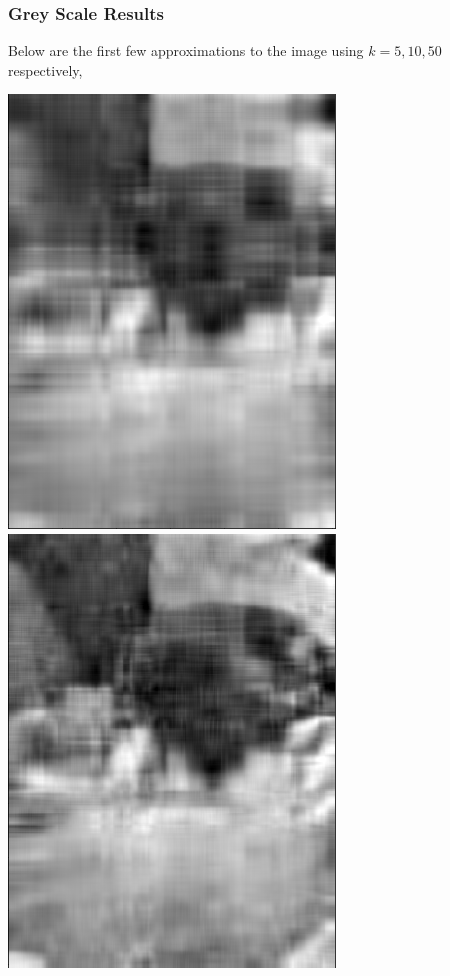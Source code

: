 \documentclass[letterpaper,12pt]{article}
\begin{document}
\subsubsection{Grey Scale Results}
Below are the first few approximations to the image using $k=5,10,50$ respectively,
\begin{center}
\includegraphics[scale=.4]{grey5.png}
\includegraphics[scale=.4]{grey10.png}

\end{center}
\end{document}
